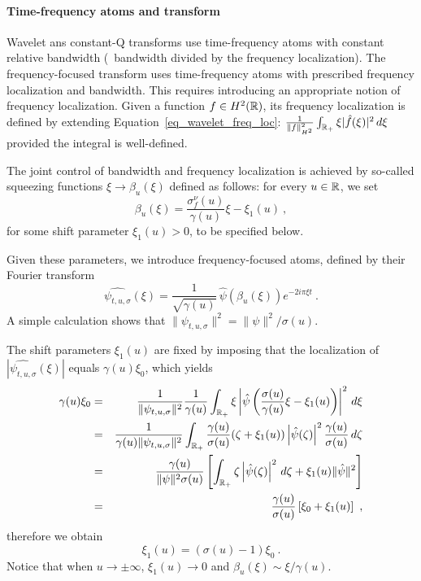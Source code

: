 \paragraph{Time-frequency atoms and transform}
Wavelet ans constant-Q transforms use time-frequency atoms with constant relative bandwidth (\ie\, bandwidth divided by the frequency localization). The frequency-focused transform uses time-frequency atoms with prescribed frequency localization and bandwidth. This requires introducing an appropriate notion of frequency localization. Given a function $f\in H^2(\mathbb{R})$, its frequency localization is defined by extending Equation~\eqref{eq_wavelet_freq_loc}:
$\frac{1}{\|f\|_{H^2}^2}\int_{\mathbb{R}_+} \xi |\hat f(\xi)|^2\,d\xi$
provided the integral is well-defined. 

\smallskip
The joint control of bandwidth and frequency localization is achieved by so-called squeezing functions $\xi\to\beta_u(\xi)$ defined as follows: for every $u\in\mathbb{R}$, we set
\begin{equation}
\label{eq_squeezing_fct}
\beta_u(\xi) = \frac{\sigma_f^\nu(u)}{\gamma(u)}\xi - \xi_1(u)\ , 
\end{equation}
for some shift parameter $\xi_1(u)>0$, to be specified below.

Given these parameters, we introduce frequency-focused atoms, defined by their Fourier transform
\begin{equation}
\widehat{\psi_{t,u,\sigma}}(\xi)=\frac{1}{\sqrt{\gamma(u)}}\,\hat\psi\left(\beta_u(\xi)\right)e^{-2i\pi\xi t}\ .
\end{equation}
A simple calculation shows that $\|\psi_{t,u,\sigma}\|^2 = \|\psi\|^2/\sigma(u)$.

The shift parameters $\xi_1(u)$ are fixed by imposing that the localization of $\left|\widehat{\psi_{t,u,\sigma}}(\xi)\right| $ equals $\gamma(u)\xi_0$, which yields
\begin{eqnarray*}
\gamma(u)\xi_0 &=& \frac{1}{\|\psi_{t,u,\sigma}\|^2}\frac{1}{\gamma(u)}
\int_{\mathbb{R}_+}\xi \left|\hat\psi\left(\frac{\sigma(u)}{\gamma(u)}\xi - \xi_1(u)\right)\right|^2\,d\xi\\
&=&\frac{1}{\gamma(u)\|\psi_{t,u,\sigma}\|^2}\int_{\mathbb{R}_+}\frac{\gamma(u)}{\sigma(u)}(\zeta+\xi_1(u))\left|\hat\psi(\zeta)\right|^2\frac{\gamma(u)}{\sigma(u)}\,d\zeta\\
&=&\frac{\gamma(u)}{\|\psi\|^2\sigma(u)}\left[\int_{\mathbb{R}_+}\zeta \left|\hat\psi(\zeta)\right|^2\,d\zeta + \xi_1(u) \|\hat\psi\|^2 \right]\\
&=&\frac{\gamma(u)}{\sigma(u)}\left[\xi_0+\xi_1(u)\right]\ ,
\end{eqnarray*}
therefore we obtain
\begin{equation}
\label{eq_xi_1}
\xi_1(u)=(\sigma(u)-1)\xi_0\ .
\end{equation}
Notice that when $u\to\pm\infty$, $\xi_1(u)\to 0$ and $\beta_u(\xi)\sim \xi/\gamma(u)$.


